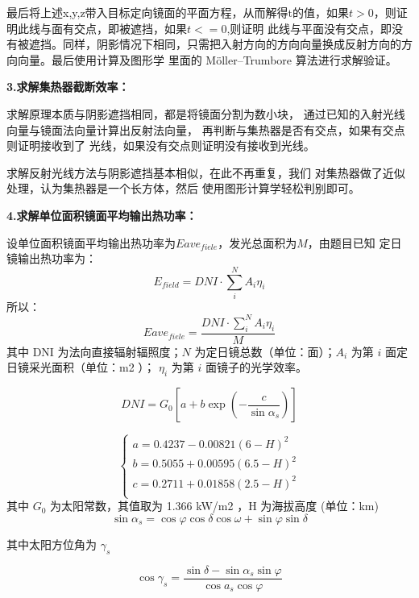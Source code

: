\documentclass{数学建模}
\begin{document}
最后将上述x,y,z带入目标定向镜面的平面方程，从而解得t的值，如果$t>0$，则证明此线与面有交点，即被遮挡，如果$t<=0$,则证明
此线与平面没有交点，即没有被遮挡。同样，阴影情况下相同，只需把入射方向的方向向量换成反射方向的方向向量。最后使用计算及图形学
里面的 Möller–Trumbore 算法进行求解验证。

\textbf{3.求解集热器截断效率：}

求解原理本质与阴影遮挡相同，都是将镜面分割为数小块，
通过已知的入射光线向量与镜面法向量计算出反射法向量，
再判断与集热器是否有交点，如果有交点则证明接收到了
光线，如果没有交点则证明没有接收到光线。

求解反射光线方法与阴影遮挡基本相似，在此不再重复，我们
对集热器做了近似处理，认为集热器是一个长方体，然后
使用图形计算学轻松判别即可。

\textbf{4.求解单位面积镜面平均输出热功率：}

设单位面积镜面平均输出热功率为$Eave_{fiele}$，发光总面积为$M$，由题目已知
定日镜输出热功率为：
\begin{equation}
    E_{field}= DNI\cdot \sum_{i}^{N} A_i \eta_i
\end{equation}
所以：
\begin{equation}
    Eave_{fiele} = \frac{DNI\cdot \sum_{i}^{N} A_i \eta_i}{M}
\end{equation}
其中 DNI 为法向直接辐射辐照度；$N$ 为定日镜总数（单位：面）；$A_i$ 为第 $i$ 面定日镜采光面积（单位：m2 ）； $\eta_i$ 为第 $i$ 面镜子的光学效率。

\begin{equation}
    DNI = G_0 [a + b \exp(-\frac{c}{\sin \alpha_s})]
\end{equation}

\begin{equation}
    \begin{cases}
        a = 0.4237 - 0.00821(6 - H)^2\\
        b = 0.5055 + 0.00595(6.5 - H)^2 \\
c = 0.2711 + 0.01858(2.5 - H)^2 \\
    \end{cases}
\end{equation}
其中 $G_0$ 为太阳常数，其值取为 1.366 kW/m2 ，H 为海拔高度 (单位：km)
\begin{equation}
    \sin \alpha_s = \cos \varphi \cos \delta \cos \omega + \sin \varphi \sin \delta
\end{equation}


其中太阳方位角为 $\gamma_s$

$$
\cos \gamma_s = \frac{\sin \delta - \sin \alpha_s \sin \varphi}{\cos a_s \cos \varphi}
$$
\end{document}

